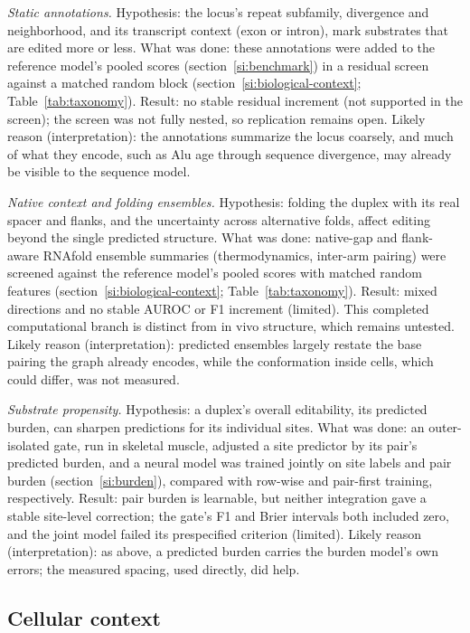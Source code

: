 \documentclass[9pt,twoside]{pnas-new}
\begin{document}
\textit{Static annotations.} Hypothesis: the locus's repeat subfamily, divergence and neighborhood, and its transcript context (exon or intron), mark substrates that are edited more or less. What was done: these annotations were added to the reference model's pooled scores (section~\ref{si:benchmark}) in a residual screen against a matched random block (section~\ref{si:biological-context}; Table~\ref{tab:taxonomy}). Result: no stable residual increment (not supported in the screen); the screen was not fully nested, so replication remains open. Likely reason (interpretation): the annotations summarize the locus coarsely, and much of what they encode, such as Alu age through sequence divergence, may already be visible to the sequence model.

\textit{Native context and folding ensembles.} Hypothesis: folding the duplex with its real spacer and flanks, and the uncertainty across alternative folds, affect editing beyond the single predicted structure. What was done: native-gap and flank-aware RNAfold ensemble summaries (thermodynamics, inter-arm pairing) were screened against the reference model's pooled scores with matched random features (section~\ref{si:biological-context}; Table~\ref{tab:taxonomy}). Result: mixed directions and no stable AUROC or F1 increment (limited). This completed computational branch is distinct from in vivo structure, which remains untested. Likely reason (interpretation): predicted ensembles largely restate the base pairing the graph already encodes, while the conformation inside cells, which could differ, was not measured.

\textit{Substrate propensity.} Hypothesis: a duplex's overall editability, its predicted burden, can sharpen predictions for its individual sites. What was done: an outer-isolated gate, run in skeletal muscle, adjusted a site predictor by its pair's predicted burden, and a neural model was trained jointly on site labels and pair burden (section~\ref{si:burden}), compared with row-wise and pair-first training, respectively. Result: pair burden is learnable, but neither integration gave a stable site-level correction; the gate's F1 and Brier intervals both included zero, and the joint model failed its prespecified criterion (limited). Likely reason (interpretation): as above, a predicted burden carries the burden model's own errors; the measured spacing, used directly, did help.

\subsection*{Cellular context}
\end{document}
